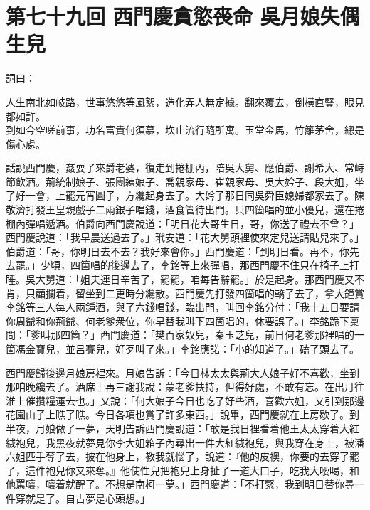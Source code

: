 
\chapter*{第七十九回 西門慶貪慾䘮命 吳月娘失偶生兒}


詞曰：

\begin{myquote} 
人生南北如岐路，世事悠悠等風絮，造化弄人無定據。翻來覆去，倒橫直豎，眼見都如許。\\
到如今空嗟前事，功名富貴何須慕，坎止流行隨所寓。玉堂金馬，竹籬茅舍，總是傷心處。

\end{myquote} 

話說西門慶，姦耍了來爵老婆，復走到捲棚內，陪吳大舅、應伯爵、謝希大、常峙節飲酒。荊統制娘子、張團練娘子、喬親家母、崔親家母、吳大妗子、段大姐，坐了好一會，上罷元宵圓子，方纔起身去了。大妗子那日同吳舜臣媳婦都家去了。陳敬濟打發王皇親戲子二兩銀子唱錢，酒食管待出門。只四箇唱的並小優兒，還在捲棚內彈唱遞酒。伯爵向西門慶說道：「明日花大哥生日，哥，你送了禮去不曾？」西門慶說道：「我早晨送過去了。」玳安道：「花大舅頭裡使來定兒送請貼兒來了。」伯爵道：「哥，你明日去不去？我好來會你。」西門慶道：「到明日看。再不，你先去罷。」少頃，四箇唱的後邊去了，李銘等上來彈唱，那西門慶不住只在椅子上打睡。{}吳大舅道：「姐夫連日辛苦了，罷罷，咱每告辭罷。」於是起身。那西門慶又不肯，只顧攔着，留坐到二更時分纔散。西門慶先打發四箇唱的轎子去了，拿大鐘賞李銘等三人每人兩鍾酒，與了六錢唱錢，臨出門，叫回李銘分付：「我十五日要請你周爺和你荊爺、何老爹衆位，你早替我叫下四箇唱的，休要誤了。」李銘跪下稟問：「爹叫那四箇？」西門慶道：「樊百家奴兒，秦玉芝兒，前日何老爹那裡唱的一箇馮金寶兒，{}並呂賽兒，好歹叫了來。」李銘應諾：「小的知道了。」磕了頭去了。

西門慶歸後邊月娘房裡來。月娘告訴：「今日林太太與荊大人娘子好不喜歡，坐到那咱晚纔去了。酒席上再三謝我說：蒙老爹扶持，但得好處，不敢有忘。在出月往淮上催攢糧運去也。」又說：「何大娘子今日也吃了好些酒，喜歡六姐，又引到那邊花園山子上瞧了瞧。今日各項也賞了許多東西。」說畢，西門慶就在上房歇了。到半夜，月娘做了一夢，{}天明告訴西門慶說道：「敢是我日裡看着他王太太穿着大紅絨袍兒，我黑夜就夢見你李大姐箱子內尋出一件大紅絨袍兒，與我穿在身上，被潘六姐匹手奪了去，披在他身上，教我就惱了，說道：『他的皮襖，你要的去穿了罷了，這件袍兒你又來奪。』{}他使性兒把袍兒上身扯了一道大口子，吃我大喓喝，和他罵嚷，嚷着就醒了。不想是南柯一夢。」西門慶道：「不打緊，我到明日替你尋一件穿就是了。自古夢是心頭想。」

